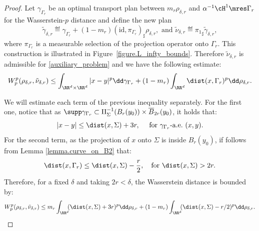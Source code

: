 \begin{proof}
Let $\gamma_{\Gamma_{r}}$ be an optimal transport plan between $m_r\rho_{\delta, r}$ and $\alpha^{-1}\cH^1\mres \Gamma_{r}$ for the Wasserstein-$p$ distance and define the new plan
\[
\tilde \gamma_{\delta, r}
\eqdef
\gamma_{\Gamma_{r}}
+
(1-m_{r})
\left(
\text{id},
\pi_{\Gamma_{r}}
\right)_\sharp
\rho_{\delta, r},
\text{ and }
\tilde\nu_{\delta, r}
\eqdef {\pi_{1}}_\sharp \tilde \gamma_{\delta, r},
\]
where $\pi_{\Gamma_{r}}$ is a measurable selection of the projection operator onto $\Gamma_{r}$. This construction is illustrated in Figure~\ref{figure.L_infty_bounds}. Therefore $\tilde\nu_{\delta, r}$ is admissible for \eqref{auxiliary_problem} and we have the following estimate:
\begin{equation*}
W_p^p(\rho_{\delta, r}, \tilde\nu_{\delta, r})
\le
\int_{\RR^d\times \RR^d} |x - y|^p\dd \gamma_{\Gamma_{r}}
+
(1 - m_{r})\int_{\RR^d} \dist(x, \Gamma_r)^p\dd \rho_{\delta,r}.
\end{equation*}

We will estimate each term of the previous inequality separately. For the first one, notice that as $\supp \gamma_{\Gamma_{r}} \subset \Pi_{\Sigma}^{-1}(B_r(y_0)) \times \overline{B}_{2r}(y_0)$, it holds that:
\[
|x - y| \le \dist(x,\Sigma) + 3r, \quad \text{ for $\gamma_{\Gamma_{r}}$-a.e.\ $(x,y)$}.
\]
For the second term, as the projection of $x$ onto $\Sigma$ is inside $B_r(y_0)$, if follows from Lemma \ref{lemma.curve_on_B2} that:
\[
\dist(x, \Gamma_r) \le \dist(x, \Sigma) - \frac{r}{2}, \quad\text{for } \dist(x, \Sigma) > 2r.
\]
Therefore, for a fixed $\delta$ and taking $2r < \delta$, the Wasserstein distance is bounded by:
\[
W_p^p(\rho_{\delta, r}, \tilde\nu_{\delta, r})
\le
m_{r}
\int_{\RR^d}\hspace*{-1mm}
(\dist(x,\Sigma) + 3r)^p\dd \rho_{\delta,r}
+
(1 - m_{r})
\int_{\RR^d}\hspace*{-1mm}
(\dist(x, \Sigma) - r/2)^p\dd \rho_{\delta,r}.
\]


\end{proof}
